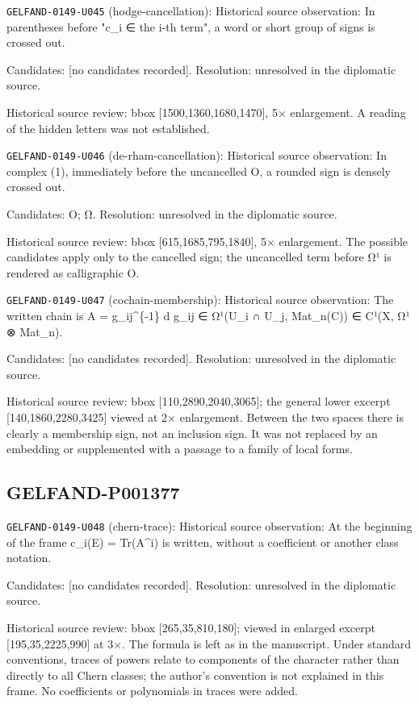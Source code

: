 \noindent\texttt{GELFAND-0149-U045} (hodge-cancellation): Historical source observation: In parentheses before "c\_i ∈ the i-th term", a word or short group of signs is crossed out.\par
Candidates: [no candidates recorded]. Resolution: unresolved in the diplomatic source.\par
Historical source review: bbox [1500,1360,1680,1470], 5× enlargement. A reading of the hidden letters was not established.\par

\noindent\texttt{GELFAND-0149-U046} (de-rham-cancellation): Historical source observation: In complex (1), immediately before the uncancelled O, a rounded sign is densely crossed out.\par
Candidates: O; Ω. Resolution: unresolved in the diplomatic source.\par
Historical source review: bbox [615,1685,795,1840], 5× enlargement. The possible candidates apply only to the cancelled sign; the uncancelled term before Ω¹ is rendered as calligraphic O.\par

\noindent\texttt{GELFAND-0149-U047} (cochain-membership): Historical source observation: The written chain is A = g\_ij\textasciicircum{}\{-1\} d g\_ij ∈ Ω¹(U\_i ∩ U\_j, Mat\_n(C)) ∈ C¹(X, Ω¹ ⊗ Mat\_n).\par
Candidates: [no candidates recorded]. Resolution: unresolved in the diplomatic source.\par
Historical source review: bbox [110,2890,2040,3065]; the general lower excerpt [140,1860,2280,3425] viewed at 2× enlargement. Between the two spaces there is clearly a membership sign, not an inclusion sign. It was not replaced by an embedding or supplemented with a passage to a family of local forms.\par

\subsection*{GELFAND-P001377}
\noindent\texttt{GELFAND-0149-U048} (chern-trace): Historical source observation: At the beginning of the frame c\_i(E) = Tr(A\textasciicircum{}i) is written, without a coefficient or another class notation.\par
Candidates: [no candidates recorded]. Resolution: unresolved in the diplomatic source.\par
Historical source review: bbox [265,35,810,180]; viewed in enlarged excerpt [195,35,2225,990] at 3×. The formula is left as in the manuscript. Under standard conventions, traces of powers relate to components of the character rather than directly to all Chern classes; the author’s convention is not explained in this frame. No coefficients or polynomials in traces were added.\par

